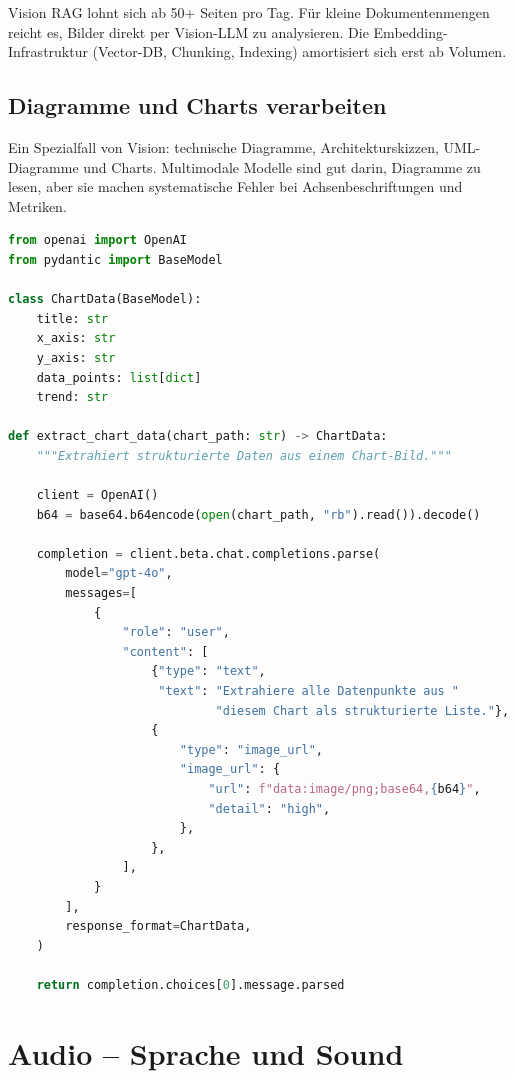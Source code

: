 \begin{praxishinweis}
Vision RAG lohnt sich ab 50+ Seiten pro Tag. Für kleine Dokumentenmengen reicht es, Bilder direkt per Vision-LLM zu analysieren. Die Embedding-Infrastruktur (Vector-DB, Chunking, Indexing) amortisiert sich erst ab Volumen.
\end{praxishinweis}

\subsection{Diagramme und Charts verarbeiten}

Ein Spezialfall von Vision: technische Diagramme, Architekturskizzen, UML-Diagramme und Charts. Multimodale Modelle sind gut darin, Diagramme zu lesen, aber sie machen systematische Fehler bei Achsenbeschriftungen und Metriken.

\begin{lstlisting}[language=Python, caption=Diagramm-Analyse mit strukturiertem Output]
from openai import OpenAI
from pydantic import BaseModel

class ChartData(BaseModel):
    title: str
    x_axis: str
    y_axis: str
    data_points: list[dict]
    trend: str

def extract_chart_data(chart_path: str) -> ChartData:
    """Extrahiert strukturierte Daten aus einem Chart-Bild."""

    client = OpenAI()
    b64 = base64.b64encode(open(chart_path, "rb").read()).decode()

    completion = client.beta.chat.completions.parse(
        model="gpt-4o",
        messages=[
            {
                "role": "user",
                "content": [
                    {"type": "text",
                     "text": "Extrahiere alle Datenpunkte aus "
                             "diesem Chart als strukturierte Liste."},
                    {
                        "type": "image_url",
                        "image_url": {
                            "url": f"data:image/png;base64,{b64}",
                            "detail": "high",
                        },
                    },
                ],
            }
        ],
        response_format=ChartData,
    )

    return completion.choices[0].message.parsed
\end{lstlisting}

\section{Audio -- Sprache und Sound}

